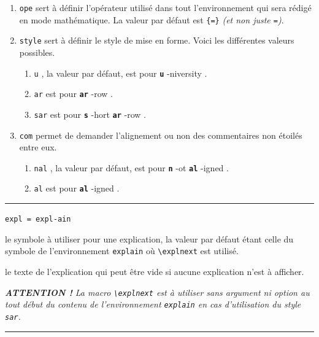 \documentclass[12pt,a4paper]{article}
\newcommand\env[1]{\texttt{#1}}
\newcommand\macro[1]{\env{\textbackslash{}#1}}
\theoremstyle{definition}
\newcommand\separation{
	\medskip
	\hfill\rule{0.5\textwidth}{0.75pt}\hfill
	\medskip
}
\newcommand\whyprefix[2]{%
	\textbf{\prefix{#1}}-#2%
}
\newcommand\mwhyprefix[2]{%
	\texttt{#1 = #1-#2}%
}
\newcommand\prefix[1]{%
	\texttt{#1}%
}
\begin{document}
\begin{enumerate}
	\item \verb+ope+ sert à définir l'opérateur utilisé dans tout l'environnement qui sera rédigé en mode mathématique. 
	      La valeur par défaut est \verb+{=}+ \emph{(et non juste \texttt{=})}.

	\item \verb+style+ sert à définir le style de mise en forme. Voici les différentes valeurs possibles.
	      \begin{enumerate}
	      		\item \prefix{u}, la valeur par défaut, est pour \whyprefix{u}{niversity}.

	      		\item \prefix{ar} est pour \whyprefix{ar}{row}.

	      		\item \prefix{sar} est pour \whyprefix{s}{hort} \whyprefix{ar}{row}.
	      \end{enumerate}

	\item \verb+com+ permet de demander l'alignement ou non des commentaires non étoilés entre eux.
	      \begin{enumerate}
	      		\item \prefix{nal}, la valeur par défaut, est pour \whyprefix{n}{ot} \whyprefix{al}{igned}.

	      		\item \prefix{al} est pour \whyprefix{al}{igned}.

	      \end{enumerate}
\end{enumerate}


\separation


  \hfill \mwhyprefix{expl}{ain}

\IDoption{} le symbole à utiliser pour une explication, la valeur par défaut étant celle du symbole de l'environnement \env{explain} où \macro{explnext} est utilisé.

\IDarg{} le texte de l'explication qui peut être vide si aucune explication n'est à afficher.

\medskip

\medskip

\emph{\textbf{ATTENTION !} La macro \macro{explnext} est à utiliser sans argument ni option au tout début du contenu de l'environnement \env{explain} en cas d'utilisation du style \texttt{sar}.}


\separation
\end{document}
